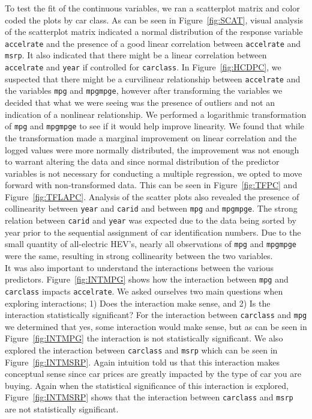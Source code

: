 \documentclass[acmsmall]{acmart}
\begin{document}
To test the fit of the continuous variables, we ran a scatterplot matrix and color coded the plots by car class. As can be seen in Figure~\ref{fig:SCAT}, visual analysis of the scatterplot matrix indicated a normal distribution of the response variable \texttt{accelrate} and the presence of a good linear correlation between \texttt{accelrate} and \texttt{msrp}. It also indicated that there might be a linear correlation between \texttt{accelrate} and \texttt{year} if controlled for \texttt{carclass}. In Figure~\ref{fig:HCDPC}, we suspected that there might be a curvilinear relationship between \texttt{accelrate} and the variables \texttt{mpg} and \texttt{mpgmpge}, however after transforming the variables we decided that what we were seeing was the presence of outliers and not an indication of a nonlinear relationship. We performed a logarithmic transformation of \texttt{mpg} and \texttt{mpgmpge} to see if it would help improve linearity. We found that while the transformation made a marginal improvement on linear correlation and the logged values were more normally distributed, the improvement was not enough to warrant altering the data and since normal distribution of the predictor variables is not necessary for conducting a multiple regression, we opted to move forward with non-transformed data. This can be seen in Figure~\ref{fig:TFPC} and Figure~\ref{fig:TFLAPC}. Analysis of the scatter plots also revealed the presence of collinearity between \texttt{year} and \texttt{carid} and between \texttt{mpg} and \texttt{mpgmpge}. The strong relation between \texttt{carid} and \texttt{year} was expected due to the data being sorted by year prior to the sequential assignment of car identification numbers. Due to the small quantity of all-electric HEV’s, nearly all observations of \texttt{mpg} and \texttt{mpgmpge} were the same, resulting in strong collinearity between the two variables. \\

It was also important to understand the interactions between the various predictors. Figure~\ref{fig:INTMPG} shows how the interaction between \texttt{mpg} and \texttt{carclass} impacts \texttt{accelrate}. We asked ourselves two main questions when exploring interactions; 1) Does the interaction make sense, and 2) Is the interaction statistically significant? For the interaction between \texttt{carclass} and \texttt{mpg} we determined that yes, some interaction would make sense, but as can be seen in Figure~\ref{fig:INTMPG} the interaction is not statistically significant.  We also explored the interaction between \texttt{carclass} and \texttt{msrp} which can be seen in Figure~\ref{fig:INTMSRP}. Again intuition told us that this interaction makes conceptual sense since car prices are greatly impacted by the type of car you are buying. Again when the statistical significance of this interaction is explored, Figure~\ref{fig:INTMSRP} shows that the interaction between \texttt{carclass} and \texttt{msrp} are not statistically significant.\\
\end{document}
